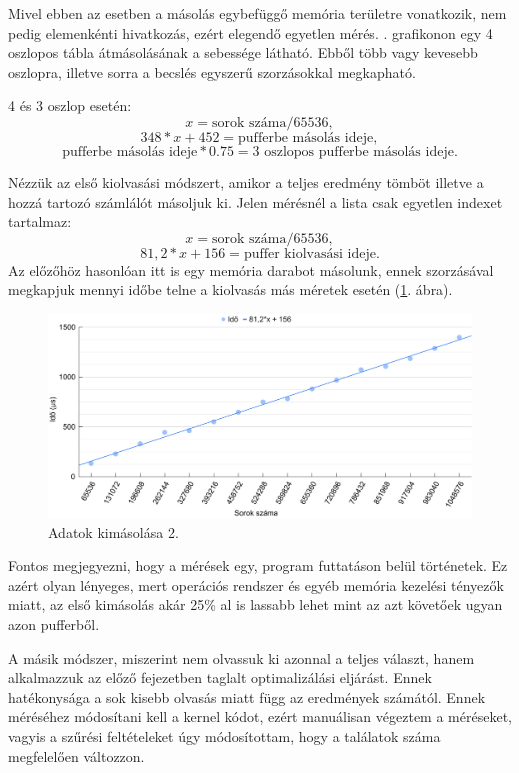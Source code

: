 Mivel ebben az esetben a másolás egybefüggő memória területre vonatkozik, nem pedig elemenkénti hivatkozás, ezért elegendő egyetlen mérés.
. grafikonon egy 4 oszlopos tábla átmásolásának a sebessége látható. Ebből több vagy kevesebb oszlopra, illetve sorra a becslés egyszerű szorzásokkal megkapható.

4 és 3 oszlop esetén:
$$ x = \text{sorok száma} / 65536, $$
$$ 348*x + 452 = \text{pufferbe másolás ideje}, $$ 
$$ \text{pufferbe másolás ideje} * 0.75 = \text{3 oszlopos pufferbe másolás ideje}. $$


Nézzük az első kiolvasási módszert, amikor a teljes eredmény tömböt illetve a hozzá tartozó számlálót másoljuk ki.
Jelen mérésnél a lista csak egyetlen indexet tartalmaz:
$$ x = \text{sorok száma} / 65536, $$
$$ 81,2*x + 156 = \text{puffer kiolvasási ideje}. $$ 
Az előzőhöz hasonlóan itt is egy memória darabot másolunk, ennek szorzásával megkapjuk mennyi időbe telne a kiolvasás más méretek esetén (\ref{fig:pufferout}. ábra).

\begin{figure}[h!]
	\centering
	\includegraphics[width=14.8cm]{images/graph/pufferout.png}
	\caption{Adatok kimásolása 2.}
	\label{fig:pufferout}
\end{figure}

Fontos megjegyezni, hogy a mérések egy, program futtatáson belül történetek. Ez azért olyan lényeges, mert operációs rendszer és egyéb memória kezelési tényezők miatt, az első kimásolás akár 25\% al is lassabb lehet mint az azt követőek ugyan azon pufferből.

A másik módszer, miszerint nem olvassuk ki azonnal a teljes választ, hanem alkalmazzuk az előző fejezetben taglalt optimalizálási eljárást.
Ennek hatékonysága a sok kisebb olvasás miatt függ az eredmények számától. Ennek méréséhez módosítani kell a kernel kódot, ezért manuálisan végeztem a méréseket, vagyis a szűrési feltételeket úgy módosítottam, hogy a találatok száma megfelelően változzon.

